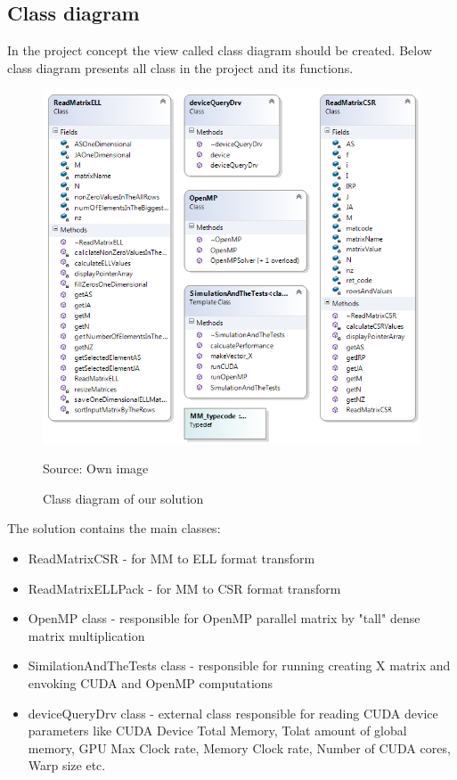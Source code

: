 \documentclass{scrreprt}
\begin{document}
\subsection{Class diagram}

In the project concept the view called class diagram should be created. Below class diagram presents all class in the project and its functions. 

\begin{figure}[h!]
\label{ClassDiagram}
\centering
\includegraphics{ClassDiagram.PNG}
\caption{Class diagram of our solution}
Source: Own image
\end{figure}
\FloatBarrier

The solution contains the main classes:
\begin{itemize}
\item ReadMatrixCSR - for MM to ELL format transform
\item ReadMatrixELLPack - for MM to CSR format transform
\item OpenMP class - responsible for OpenMP parallel matrix by "tall" dense matrix multiplication
\item SimilationAndTheTests class - responsible for running creating X matrix and envoking CUDA and OpenMP computations
\item deviceQueryDrv class - external class responsible for reading CUDA device parameters like CUDA Device Total Memory, Tolat amount of global memory, GPU Max Clock rate, Memory Clock rate, Number of CUDA cores, Warp size etc.
\end{itemize}
\end{document}
